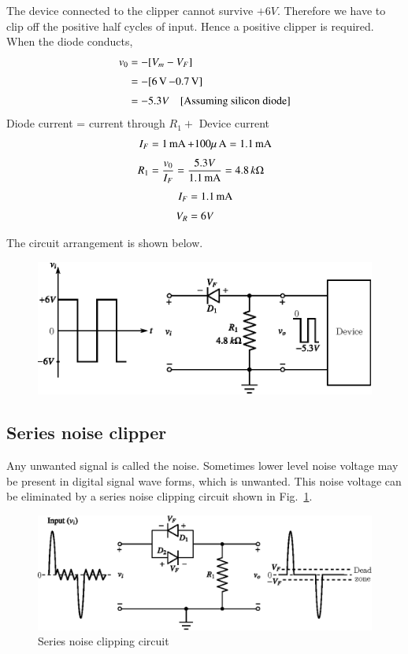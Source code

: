 \begin{solution}
The device connected to the clipper cannot survive $+6V$. Therefore we have to clip off the positive half cycles of input. Hence a positive clipper is required. When the diode conducts,
\begin{align*}
v_{0} &= -[V_{m}-V_{F}]\\[3pt]
      &= -[6\operatorname{\mathrm{V}}-0.7\operatorname{\mathrm{V}}]\\[3pt]
&= -5.3V\quad\text{[Assuming silicon diode]}
\end{align*}
Diode current = current through $R_{1}+$ Device current
\begin{align*}
I_{F} &= 1\operatorname{mA} + 100\mu \text{\,A} = 1.1\operatorname{mA}\\[3pt]
R_{1} &= \frac{v_{0}}{I_{F}}=\frac{5.3V}{1.1\operatorname{mA}}=4.8\,k\Omega
\end{align*}
\begin{align*}
I_{F} &= 1.1\operatorname{mA}\\[3pt]
V_{R} &= 6V
\end{align*}

\eject

The circuit arrangement is shown below.
\begin{figure}[H]
\centering
\includegraphics[scale=.9]{chap2/sol2.39.eps}
\end{figure}
\vskip -1cm
\end{solution}

\subsection{Series noise clipper}\label{sec2.30.3}

Any unwanted signal is called the noise. Sometimes lower level noise voltage may be present in digital signal wave forms, which is unwanted. This noise voltage can be eliminated by a series noise clipping circuit shown in Fig.~\ref{fig2.27}.
\begin{figure}[H]
\centering
\includegraphics[scale=.9]{chap2/fig2.27.eps}
\caption{Series noise clipping circuit}\label{fig2.27}
\end{figure}


